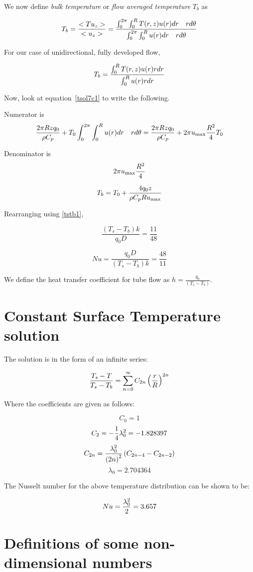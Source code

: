 We now define {\em bulk temperature} or {\em flow averaged temperature} $T_b$ as 

$$
T_b = {<T u_z> \over < u_z >} = { \int_{0}^{2\pi}{ \int_{0}^{R}{ T(r,z) u(r) dr}\quad rd\theta} \over \int_{0}^{2\pi}{ \int_{0}^{R}{ u(r) dr}\quad rd\theta} }
$$

For our case of unidirectional, fully developed flow,


$$
T_b = { \int_{0}^{R}{ T(r,z) u(r) rdr} \over \int_{0}^{R}{ u(r) rdr}}
$$

Now, look at equation~\ref{tsol7c1} to write the following.

Numerator is
$$
\frac{2 \pi R z q_0}{\rho C_p} + T_0 \int_0^{2\pi}{ \int_0^R{ u(r) dr \quad rd\theta}} = \frac{2 \pi R z q_0}{\rho C_p} + 2\pi u_{\text{max}} \frac{R^2}{4} T_0
$$

Denominator is
$$
2\pi u_{\text{max}} \frac{R^2}{4}
$$

$$
T_b = T_0 + \frac{4 q_0 z}{\rho C_p R u_{\text{max}}}
$$

Rearranging using \ref{tstb1},

$$
\frac{\left(T_s - T_b\right)k}{q_0 D} = \frac{11}{48}
$$

$$
\boxed{
  Nu = \frac{q_0 D}{\left(T_s - T_b\right)k} = \frac{48}{11}
}
$$

We define the heat transfer coefficient for tube flow as $ h = \frac{q_0}{\left( T_s - T_b \right)} $.

\section{Constant Surface Temperature solution}

The solution is in the form of an infinite series:

$$ {T_s - T \over T_s - T_b} = \sum_{n=0}^{\infty}{C_{2n} \left({r \over R} \right)^{2n}} $$

Where the coefficients are given as follows:

$$ C_0 = 1$$
$$ C_2 = - {1 \over 4} \lambda_0^2 = -1.828397 $$
$$ C_{2n} = {\lambda_0^2 \over \left(2n\right)^2} \left( C_{2n-4} - C_{2n-2} \right) $$
$$ \lambda_0 = 2.704364 $$

The Nusselt number for the above temperature distribution can be shown to be:

$$ Nu = {\lambda_0^2 \over 2} = 3.657 $$




\section{Definitions of some non-dimensional numbers}

